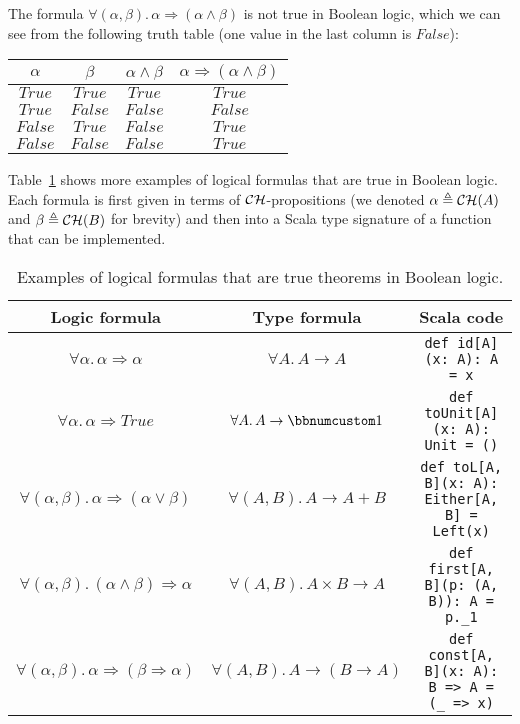 The formula $\forall(\alpha,\beta).\,\alpha\Rightarrow(\alpha\wedge\beta)$
is not true in Boolean logic, which we can see from the following
truth table (one value in the last column is $False$):
\begin{center}
{\small{}}%
\begin{tabular}{|c|c|c|c|}
\hline 
{\small{}$\alpha$} & {\small{}$\beta$} & \textbf{\small{}$\alpha\wedge\beta$} & {\small{}$\alpha\Rightarrow(\alpha\wedge\beta)$}\tabularnewline
\hline 
\hline 
{\small{}$True$} & {\small{}$True$} & {\small{}$True$} & {\small{}$True$}\tabularnewline
\hline 
{\small{}$True$} & {\small{}$False$} & {\small{}$False$} & {\small{}$False$}\tabularnewline
\hline 
{\small{}$False$} & {\small{}$True$} & {\small{}$False$} & {\small{}$True$}\tabularnewline
\hline 
{\small{}$False$} & {\small{}$False$} & {\small{}$False$} & {\small{}$True$}\tabularnewline
\hline 
\end{tabular}{\small\par}
\par\end{center}

Table~\ref{tab:Logical-formulas-Boolean-theorems} shows more examples
of logical formulas that are true in Boolean logic. Each formula is
first given in terms of ${\cal CH}$-propositions (we denoted $\alpha\triangleq{\cal CH}(A)$
and $\beta\triangleq{\cal CH}(B)$ for brevity) and then into a Scala
type signature of a function that can be implemented.

\begin{table}
\begin{centering}
\begin{tabular}{|c|c|c|}
\hline 
\textbf{\small{}Logic formula} & \textbf{\small{}Type formula} & \textbf{\small{}Scala code}\tabularnewline
\hline 
\hline 
{\footnotesize{}$\forall\alpha.\,\alpha\Rightarrow\alpha$} & {\footnotesize{}$\forall A.\,A\rightarrow A$} & \lstinline!def id[A](x: A): A = x!\tabularnewline
\hline 
{\footnotesize{}$\forall\alpha.\,\alpha\Rightarrow True$} & {\footnotesize{}$\forall A.\,A\rightarrow\bbnum 1$} & \lstinline!def toUnit[A](x: A): Unit = ()!\tabularnewline
\hline 
{\footnotesize{}$\forall(\alpha,\beta).\,\alpha\Rightarrow(\alpha\vee\beta)$} & {\footnotesize{}$\forall(A,B).\,A\rightarrow A+B$} & \lstinline!def toL[A, B](x: A): Either[A, B] = Left(x)!\tabularnewline
\hline 
{\footnotesize{}$\forall(\alpha,\beta).\,(\alpha\wedge\beta)\Rightarrow\alpha$} & {\footnotesize{}$\forall(A,B).\,A\times B\rightarrow A$} & \lstinline!def first[A, B](p: (A, B)): A = p._1!\tabularnewline
\hline 
{\footnotesize{}$\forall(\alpha,\beta).\,\alpha\Rightarrow(\beta\Rightarrow\alpha)$} & {\footnotesize{}$\forall(A,B).\,A\rightarrow(B\rightarrow A)$} & \lstinline!def const[A, B](x: A): B => A = (_ => x)!\tabularnewline
\hline 
\end{tabular}
\par\end{centering}
\caption{Examples of logical formulas that are true theorems in Boolean logic.\label{tab:Logical-formulas-Boolean-theorems}}
\end{table}

